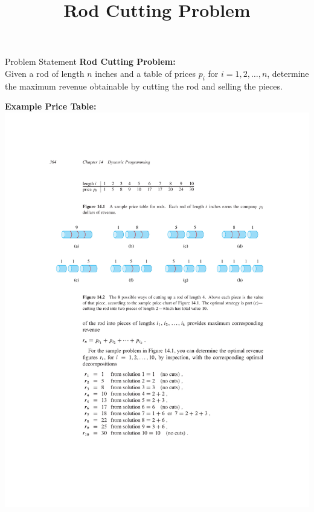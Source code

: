 \documentclass{beamer}
\title{Rod Cutting Problem}
\author{}
\date{}
\begin{document}
\frame{\titlepage}

\begin{frame}{Problem Statement}
    \textbf{Rod Cutting Problem:}\\
    Given a rod of length $n$ inches and a table of prices $p_i$ for $i = 1, 2, \dots, n$, determine the maximum revenue obtainable by cutting the rod and selling the pieces.

    \vspace{1em}
    \textbf{Example Price Table:}
    \centering
    \includegraphics[width=\textwidth,clip=true,trim=5cm 22cm 8cm 4.5cm]{figures/p364}
\end{frame}
\end{document}
